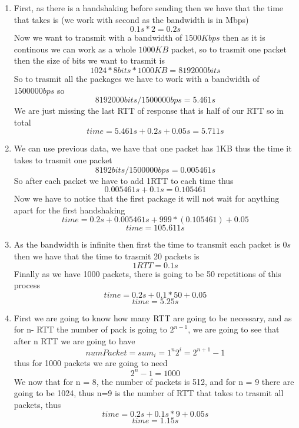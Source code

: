 \documentclass{assignment}
\begin{document}
\begin{enumerate}
  \item First, as there is a handshaking before sending then we have that the
    time that takes is (we work with second as the bandwidth is in Mbps)
    $$0.1s * 2 = 0.2s$$
    Now we want to transmit with a bandwidth of $1500Kbps$ then as it is
    continous we can work as a whole $1000KB$ packet, so to trasmit one packet
    then the size of bits we want to trasmit is
    $$1024*8bits*1000KB = 8192000bits$$
    So to trasmit all the packages we have to work with a bandwidth of
    $1500000bps$ so
    $$8192000bits / 1500000bps = 5.461s$$
    We are just missing the last RTT of response that is half of our RTT
    so in total
    $$time = 5.461s + 0.2s + 0.05s = 5.711s$$
  \item We can use previous data, we have that one packet has 1KB thus the time
    it takes to trasmit one packet
    $$8192bits / 1500000bps = 0.005461s$$
    So after each packet we have to add 1RTT to each time thus
    $$0.005461s + 0.1s = 0.105461$$
    Now we have to notice that the first package it will not wait for anything
    apart for the first handshaking
    $$time = 0.2s + 0.005461s + 999*(0.105461) + 0.05$$
    $$time = 105.611s$$
  \item As the bandwidth is infinite then first the time to transmit each packet
    is $0s$ then we have that the time to trasmit 20 packets is
    $$1RTT = 0.1s$$
    Finally as we have 1000 packets, there is going to be 50 repetitions of this process
    $$time = 0.2s + 0.1*50+ 0.05$$
    $$time =  5.25s$$
  \item First we are going to know how many RTT are going to be necessary, and
    as for n- RTT the number of pack is going to $2^{n-1}$, we are going to see that
    after n RTT we are going to have 
    $$numPacket=sum_i=1^n 2^{i} = 2^{n+1} - 1$$
    thus for 1000 packets we are going to need 
    $$2^n -1 = 1000$$
    We now that for n = 8, the number of packets is 512, and for n = 9 there
    are going to be 1024, thus n=9 is the number of RTT that takes to trasmit
    all packets, thus
    $$time = 0.2s + 0.1s*9 + 0.05s$$
    $$time = 1.15s$$
\end{enumerate}
\end{document}
